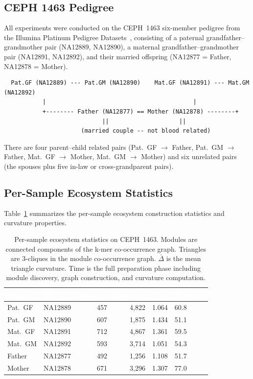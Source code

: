 \documentclass{../yalumba}
\begin{document}
\subsection{CEPH 1463 Pedigree}

All experiments were conducted on the CEPH~1463 six-member pedigree from
the Illumina Platinum Pedigree Datasets~\cite{ceph1463}, consisting of
a paternal grandfather--grandmother pair (NA12889, NA12890), a maternal
grandfather--grandmother pair (NA12891, NA12892), and their married
offspring (NA12877 = Father, NA12878 = Mother).

\begin{pedigree}
\begin{verbatim}
  Pat.GF (NA12889) --- Pat.GM (NA12890)    Mat.GF (NA12891) --- Mat.GM (NA12892)
           |                                          |
           +-------- Father (NA12877) == Mother (NA12878) --------+
                            ||                    ||
                      (married couple -- not blood related)
\end{verbatim}
\end{pedigree}

There are four parent--child related pairs (Pat.~GF $\to$ Father,
Pat.~GM $\to$ Father, Mat.~GF $\to$ Mother, Mat.~GM $\to$ Mother) and
six unrelated pairs (the spouses plus five in-law or cross-grandparent
pairs).

\subsection{Per-Sample Ecosystem Statistics}

Table~\ref{tab:samples} summarizes the per-sample ecosystem construction
statistics and curvature properties.

\begin{table}[htbp]
\centering
\tablestyle
\caption{Per-sample ecosystem statistics on CEPH~1463.  Modules are
connected components of the k-mer co-occurrence graph.  Triangles are
3-cliques in the module co-occurrence graph.  $\bar\Delta$ is the
mean triangle curvature.  Time is the full preparation phase including
module discovery, graph construction, and curvature computation.}
\label{tab:samples}
\begin{tabular}{@{}llrrrl@{}}
\toprule
\rowcolor{table-header}
\textcolor{white}{\textbf{Sample}} &
\textcolor{white}{\textbf{ID}} &
\textcolor{white}{\textbf{Modules}} &
\textcolor{white}{\textbf{Triangles}} &
\textcolor{white}{\textbf{$\bar\Delta$}} &
\textcolor{white}{\textbf{Time (s)}} \\
\midrule
Pat.~GF & NA12889 & 457 & 4{,}822 & 1.064 & 60.8 \\
Pat.~GM & NA12890 & 607 & 1{,}875 & 1.434 & 51.1 \\
Mat.~GF & NA12891 & 712 & 4{,}867 & 1.361 & 59.5 \\
Mat.~GM & NA12892 & 593 & 3{,}714 & 1.051 & 54.3 \\
Father  & NA12877 & 492 & 1{,}256 & 1.108 & 51.7 \\
Mother  & NA12878 & 671 & 3{,}296 & 1.307 & 77.0 \\
\bottomrule
\end{tabular}
\end{table}
\end{document}
